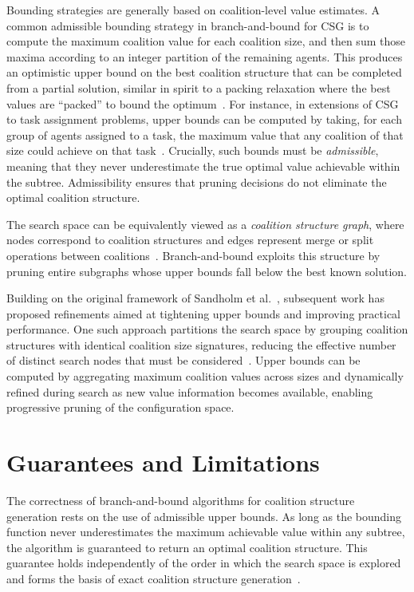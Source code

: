 \documentclass{article}
\begin{document}
Bounding strategies are generally based on coalition-level value estimates. A common admissible bounding strategy in branch-and-bound for CSG is to compute the maximum coalition value for each coalition size, and then sum those maxima according to an integer partition of the remaining agents. This produces an optimistic upper bound on the best coalition structure that can be completed from a partial solution, similar in spirit to a packing relaxation where the best values are ``packed'' to bound the optimum~\cite{RAHWAN2015139}. For instance, in extensions of CSG to task assignment problems, upper bounds can be computed by taking, for each group of agents assigned to a task, the maximum value that any coalition of that size could achieve on that task~\cite{prantare2017algorithm}. Crucially, such bounds must be \emph{admissible}, meaning that they never underestimate the true optimal value achievable within the subtree. Admissibility ensures that pruning decisions do not eliminate the optimal coalition structure.

The search space can be equivalently viewed as a \emph{coalition structure graph}, where nodes correspond to coalition structures and edges represent merge or split operations between coalitions~\cite{sandholm1999coalition}. Branch-and-bound exploits this structure by pruning entire subgraphs whose upper bounds fall below the best known solution.

Building on the original framework of Sandholm et al.~\cite{sandholm1999coalition}, subsequent work has proposed refinements aimed at tightening upper bounds and improving practical performance. One such approach partitions the search space by grouping coalition structures with identical coalition size signatures, reducing the effective number of distinct search nodes that must be considered~\cite{rahwan2007near}. Upper bounds can be computed by aggregating maximum coalition values across sizes and dynamically refined during search as new value information becomes available, enabling progressive pruning of the configuration space.

\section{Guarantees and Limitations}

The correctness of branch-and-bound algorithms for coalition structure generation rests on the use of admissible upper bounds. As long as the bounding function never underestimates the maximum achievable value within any subtree, the algorithm is guaranteed to return an optimal coalition structure. This guarantee holds independently of the order in which the search space is explored and forms the basis of exact coalition structure generation~\cite{sandholm1999coalition,rahwan2011minimum}.
\end{document}

